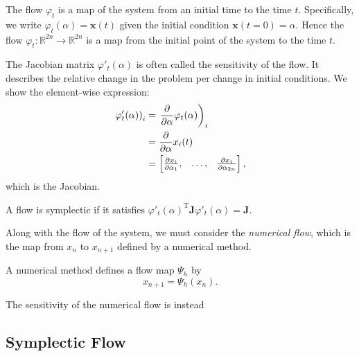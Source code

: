 \begin{definition}
	The flow $\varphi_t$ is a map of the system from an initial time to the time $t$.
	Specifically, we write $\varphi_t(\alpha) = \mathbf{x}(t)$ given the initial condition $\mathbf{x}(t=0) = \alpha$. Hence the flow $\varphi_t:\mathds{R}^{2n}\rightarrow \mathds{R}^{2n}$ is a map from the initial point of the system to the time $t$.
\end{definition}
The Jacobian matrix $\varphi'_t({\alpha})$ is often called the sensitivity of the flow.
It describes the relative change in the problem per change in initial conditions.
We show the element-wise expression: %
\begin{align*}
	\left. \varphi'_t(\alpha) \right)_i &= \left. \frac{\partial}{\partial \alpha} \varphi_t(\alpha) \right)_i \\
	&= \frac{\partial}{\partial \alpha} x_i(t) \\
	&= \begin{bmatrix}
		\frac{\partial x_i}{\partial \alpha_1}, & \mathellipsis, & \frac{\partial x_i}{\partial \alpha_{2n}}
	\end{bmatrix},
\end{align*}
which is the Jacobian.
\begin{definition}
	A flow is symplectic if it satisfies $\varphi'_t(\alpha)^\mathrm{T} \mathbf{J} \varphi'_t(\alpha) = \mathbf{J}.$
\end{definition}
Along with the flow of the system, we must consider the \textit{numerical flow},
which is the map from $x_n$ to $x_{n+1}$ defined by a numerical method.
\begin{definition}
	A numerical method defines a flow map $\Psi_h$ by
	\begin{equation*}
		x_{n+1} = \Psi_h(x_n).
	\end{equation*}
\end{definition}
The sensitivity of the numerical flow is instead

\subsection{Symplectic Flow}

